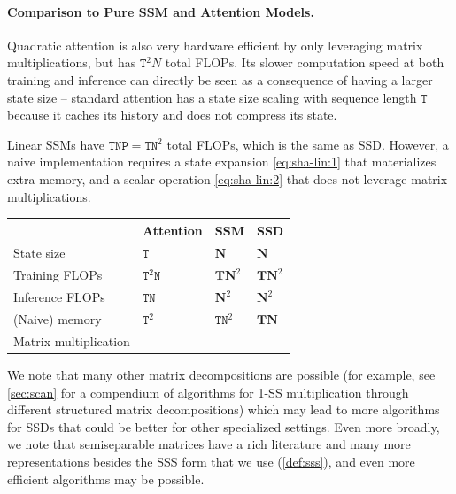 \documentclass{article}
\newcommand{\cmark}{\ding{51}}
\begin{document}
\paragraph{Comparison to Pure SSM and Attention Models.}

Quadratic attention is also very hardware efficient by only leveraging matrix multiplications, but has $\mathtt{T}^2 N$ total FLOPs.
Its slower computation speed at both training and inference can directly be seen as a consequence of having a larger state size -- standard attention has a state size scaling with sequence length $\mathtt{T}$ because it caches its history and does not compress its state.

Linear SSMs have $\mathtt{TNP} = \mathtt{TN}^2$ total FLOPs, which is the same as SSD.
However, a naive implementation requires a state expansion \eqref{eq:sha-lin:1} that materializes extra memory,
and a scalar operation \eqref{eq:sha-lin:2} that does not leverage matrix multiplications.

\begin{center}
  \begin{tabular}{@{}llll@{}}
    \toprule
                            & Attention                & SSM                                        & \textbf{SSD} \\
    \midrule
    State size              & $\mathtt{T}$             & $\mathtt{\mathbf{N}}$                      & $\mathtt{\mathbf{N}}$ \\
    Training FLOPs          & $\mathtt{T}^2\mathtt{N}$ & $\mathtt{\mathbf{T}}\mathtt{\mathbf{N}}^2$ & $\mathtt{\mathbf{T}}\mathtt{\mathbf{N}}^2$ \\
    Inference FLOPs         & $\mathtt{T}\mathtt{N}$   & $\mathtt{\mathbf{N}}^2$                    & $\mathtt{\mathbf{N}}^2$ \\
    \midrule
    (Naive) memory          & $\mathtt{T}^2$           & $\mathtt{T}\mathtt{N}^2$                   & $\mathtt{\mathbf{T}}\mathtt{\mathbf{N}}$ \\
    Matrix multiplication   & \cmark                   &                                            & \textbf{\cmark} \\
    \bottomrule
  \end{tabular}
  \label{tab:compute}
\end{center}

We note that many other matrix decompositions are possible (for example, see \cref{sec:scan} for a compendium of algorithms for 1-SS multiplication through different structured matrix decompositions)
which may lead to more algorithms for SSDs that could be better for other specialized settings.
Even more broadly, we note that semiseparable matrices have a rich literature and many more representations besides the SSS form that we use (\cref{def:sss}),
and even more efficient algorithms may be possible.
\end{document}
